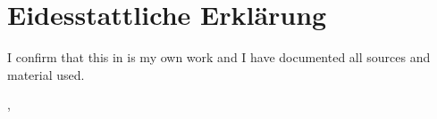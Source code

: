 \chapter*{Eidesstattliche Erklärung}

\noindent
I confirm that this \getThesisType{} in \getStudyCourse{} is my own work and I have documented all sources and material used.

\vspace{15mm}
\noindent
\getSubmissionLocation{}, \getSubmissionDate{} \hspace{50mm} \getAuthor{}
